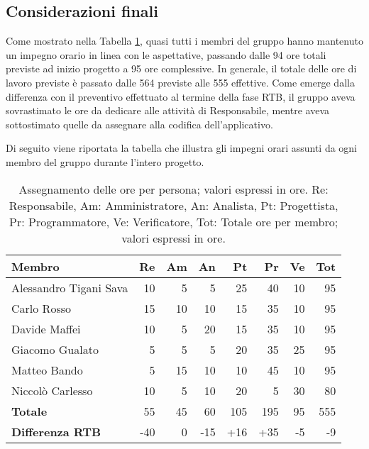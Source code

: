 \subsection{Considerazioni finali}
Come mostrato nella Tabella \ref{t:orario}, quasi tutti i membri del gruppo hanno mantenuto un impegno orario in linea con le aspettative, passando dalle 94 ore totali previste ad inizio progetto a 95 ore complessive.
In generale, il totale delle ore di lavoro previste è passato dalle 564 previste alle 555 effettive.
Come emerge dalla differenza con il preventivo effettuato al termine della fase RTB, il gruppo aveva sovrastimato le ore da dedicare alle attività di Responsabile, mentre aveva sottostimato quelle da assegnare alla codifica dell'applicativo.

Di seguito viene riportata la tabella che illustra gli impegni orari assunti da ogni membro del gruppo durante l'intero progetto.
\begin{table}[H]
	\centering
	\begin{tabular}{l|r|r|r|r|r|r|r}
		\textbf{Membro}         & \textbf{Re} & \textbf{Am} & \textbf{An} & \textbf{Pt} & \textbf{Pr} & \textbf{Ve} & \textbf{Tot} \\
		\hline
		Alessandro Tigani Sava  & 10          & 5           & 5           & 25          & 40          & 10          & 95           \\
		Carlo Rosso             & 15          & 10          & 10          & 15          & 35          & 10          & 95           \\
		Davide Maffei           & 10          & 5           & 20          & 15          & 35          & 10          & 95           \\
		Giacomo Gualato         & 5           & 5           & 5           & 20          & 35          & 25          & 95           \\
		Matteo Bando            & 5           & 15          & 10          & 10          & 45          & 10          & 95           \\
		Niccolò Carlesso        & 10          & 5           & 10          & 20          & 5           & 30          & 80           \\
		\hline
		\textbf{Totale}         & 55          & 45          & 60          & 105         & 195         & 95          & 555          \\
		\textbf{Differenza RTB} & -40         & 0           & -15         & +16         & +35         & -5          & -9           \\
		\hline
	\end{tabular}
	\caption{Assegnamento delle ore per persona; valori espressi in ore.
		Re: Responsabile, Am: Amministratore, An: Analista, Pt:
		Progettista, Pr: Programmatore, Ve: Verificatore, Tot: Totale ore per
		membro; valori espressi in ore.}
	\label{t:orario}
\end{table}

